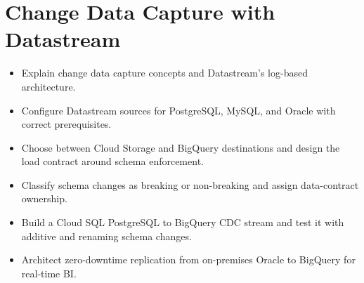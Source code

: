 \chapter{Change Data Capture with Datastream}

\begin{objectives}
\begin{itemize}
    \item Explain change data capture concepts and Datastream's log-based architecture.
    \item Configure Datastream sources for PostgreSQL, MySQL, and Oracle with correct prerequisites.
    \item Choose between Cloud Storage and BigQuery destinations and design the load contract around schema enforcement.
    \item Classify schema changes as breaking or non-breaking and assign data-contract ownership.
    \item Build a Cloud SQL PostgreSQL to BigQuery CDC stream and test it with additive and renaming schema changes.
    \item Architect zero-downtime replication from on-premises Oracle to BigQuery for real-time BI.
\end{itemize}
\end{objectives}

